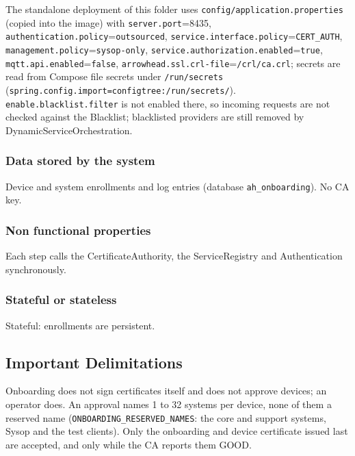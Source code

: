 \documentclass[a4paper]{arrowhead}
\begin{document}
The standalone deployment of this folder uses \texttt{config/\allowbreak{}application.\allowbreak{}properties} (copied into the image) with \texttt{server.\allowbreak{}port}=8435, \texttt{authentication.\allowbreak{}policy}=\texttt{outsourced}, \texttt{service.\allowbreak{}interface.\allowbreak{}policy}=\texttt{CERT\_AUTH}, \texttt{management.\allowbreak{}policy}=\texttt{sysop-\allowbreak{}only}, \texttt{service.\allowbreak{}authorization.\allowbreak{}enabled}=\texttt{true}, \texttt{mqtt.\allowbreak{}api.\allowbreak{}enabled}=\texttt{false}, \texttt{arrowhead.\allowbreak{}ssl.\allowbreak{}crl-\allowbreak{}file}=\texttt{/\allowbreak{}crl/\allowbreak{}ca.\allowbreak{}crl}; secrets are read from Compose file secrets under \texttt{/\allowbreak{}run/\allowbreak{}secrets} (\texttt{spring.\allowbreak{}config.\allowbreak{}import=\allowbreak{}configtree:\allowbreak{}/\allowbreak{}run/\allowbreak{}secrets/}). \texttt{enable.\allowbreak{}blacklist.\allowbreak{}filter} is not enabled there, so incoming requests are not checked against the Blacklist; blacklisted providers are still removed by Dynamic\allowbreak{}Service\allowbreak{}Orchestration.

\subsubsection{Data stored by the system}

Device and system enrollments and log entries (database \texttt{ah\_\allowbreak{}onboarding}). No CA key.

\subsubsection{Non functional properties}

Each step calls the Certificate\allowbreak{}Authority, the ServiceRegistry and Authentication synchronously.

\subsubsection{Stateful or stateless}

Stateful: enrollments are persistent.

\subsection{Important Delimitations}
\label{sec:delimitations}

Onboarding does not sign certificates itself and does not approve devices; an operator does. An approval names 1 to 32 systems per device, none of them a reserved name (\texttt{ONBOARDING\_\allowbreak{}RESERVED\_\allowbreak{}NAMES}: the core and support systems, Sysop and the test clients). Only the onboarding and device certificate issued last are accepted, and only while the CA reports them GOOD.
\end{document}
